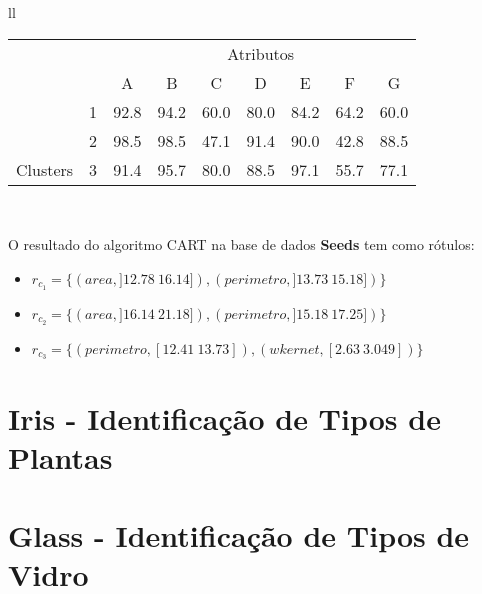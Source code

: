 \begin{table}[!h]
\begin{tabular}{ll}
       \small\addtolength{\tabcolsep}{-4pt}
   \begin{tabular}{|cl|c|c|c|c|c|c|c|}
        \hline \hline
                                 &   & \multicolumn{7}{c|}{Atributos}                                               \\ \cline{3-9} 
       \multicolumn{1}{|l}{}                            &   & A    & B & C & D & E & F & G \\ \hline
        \multicolumn{1}{|c|}{}                           & 1 & 92.8 & 94.2   & 60.0      & 80.0 & 84.2 & 64.2   & 60.0   \\ \cline{2-9} 
        \multicolumn{1}{|c|}{}                           & 2 & 98.5 & 98.5   & 47.1      & 91.4 & 90.0 & 42.8  & 88.5  \\ \cline{2-9} 
        \multicolumn{1}{|c|}{\multirow{-3}{*}{Clusters}} & 3 & 91.4 & 95.7   & 80.0      & 88.5 & 97.1 & 55.7  & 77.1  \\ \hline
   \end{tabular}
   \\
 
 \end{tabular}
 \label{tab:execucoes:seed:cart}
\end{table}

O resultado do algoritmo CART na base de dados \textbf{Seeds} tem como rótulos: 
\begin{itemize}[noitemsep]
 \item ${r_{c_1}=\{ (area, ]12.78 ~ 16.14]), (perimetro, ]13.73 ~ 15.18]) \} }$
 \item ${r_{c_2}=\{ (area, ]16.14 ~ 21.18]), (perimetro, ]15.18 ~ 17.25]) \} }$
 \item ${r_{c_3}=\{ (perimetro, [12.41 ~ 13.73]),  (wkernet, [2.63 ~ 3.049]) \} }$
\end{itemize}


\section{Iris - Identificação de Tipos de Plantas}



 

  
 

\section{Glass - Identificação de Tipos de Vidro}
